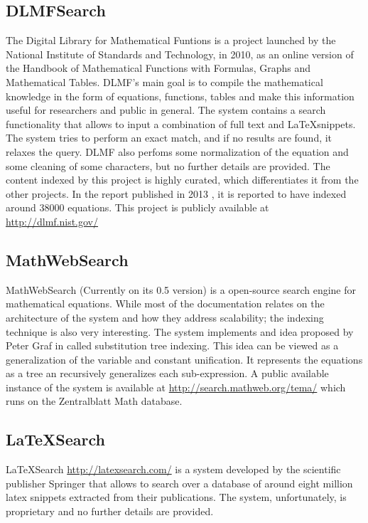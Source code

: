 \subsection{DLMFSearch}
The Digital Library for Mathematical Funtions \cite{dlmf} is a project launched by the National Institute of Standards and Technology, in 2010, as an online version of the  Handbook of Mathematical Functions with Formulas, Graphs and Mathematical Tables\cite{handbook}. DLMF's main goal is to compile the mathematical knowledge in the form of equations, functions, tables and make this information useful for researchers and public in general. The system contains a search functionality that allows to input a combination of full text and \LaTeX snippets. The system tries to perform an exact match, and if no results are found, it relaxes the query. DLMF also perfoms some normalization of the equation and some cleaning of some characters, but no further details are provided. The content indexed by this project is highly curated, which differentiates it from the other projects. In the report published in 2013 \cite{dlmf2}, it is reported to have indexed around 38000 equations. This project is publicly available at \url{http://dlmf.nist.gov/}

\subsection{MathWebSearch}
MathWebSearch\cite{mathwebsearch} (Currently on its 0.5 version) is a open-source search engine for mathematical equations. While most of the documentation relates on the architecture of the system and how they address scalability; the indexing technique is also very interesting. The system implements and idea proposed by Peter Graf in \cite{substitution_tree_indexing} called substitution tree indexing. This idea can be viewed as a generalization of the variable and constant unification. It represents the equations as a tree an recursively generalizes each sub-expression. A public available instance of the system is available at \url{http://search.mathweb.org/tema/} which runs on the Zentralblatt Math database\cite{zb}.


\subsection{LaTeXSearch}
LaTeXSearch \url{http://latexsearch.com/} is a system developed by the scientific publisher Springer that allows to search over a database of around eight million latex snippets extracted from their publications. The system, unfortunately, is proprietary and no further details are provided.

